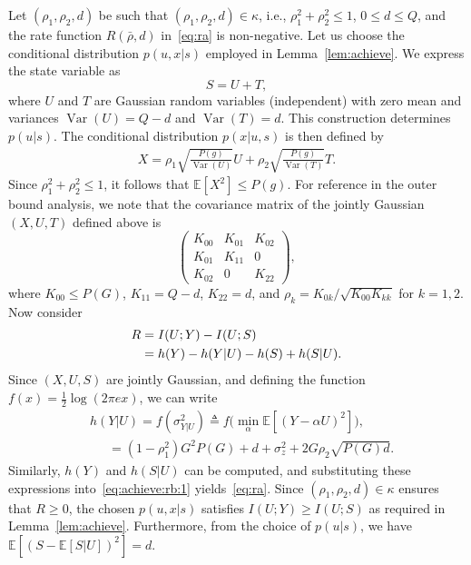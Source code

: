 \documentclass[journal]{IEEEtran}
\DeclareMathOperator{\Var}{Var}
\begin{document}
Let $(\rho_1, \rho_2, d)$ be such that $(\rho_1, \rho_2, d) \in \kappa$, i.e., $\rho_1^2 + \rho_2^2 \leq 1$, $0 \leq d \leq Q$, and the rate function $R(\bar{\rho}, d)$ in~\eqref{eq:ra} is non-negative. Let us choose the conditional distribution $p(u,x|s)$ employed in Lemma~\ref{lem:achieve}.
We express the state variable as
\begin{equation}
S = U + T, \label{eqs}
\end{equation}
where $U$ and $T$ are Gaussian random variables (independent) with zero mean and variances $\Var(U) = Q - d$ and $\Var(T) = d$. This construction determines $p(u|s)$. The conditional distribution $p(x|u,s)$ is then defined by
\begin{align} \label{eq:inp:1}
X = \rho_1 \sqrt{\frac{P(g)}{\Var(U)}} U
+ \rho_2 \sqrt{\frac{P(g)}{\Var(T)}} T.
\end{align}
Since $\rho_1^2 + \rho_2^2 \leq 1$, it follows that $\mathbb{E}[X^2] \leq P(g)$. For reference in the outer bound analysis, we note that the covariance matrix of the jointly Gaussian $(X, U, T)$ defined above is
\begin{equation}
\left(
\begin{array}{ccc}
K_{00} & K_{01} & K_{02}\\
K_{01} & K_{11} & 0\\
K_{02} & 0 & K_{22}
\end{array}
\right),
\end{equation}
where $K_{00} \leq P(G)$, $K_{11} = Q - d$, $K_{22} = d$, and $\rho_k = K_{0k}/\sqrt{K_{00}K_{kk}}$ for $k = 1, 2$. Now consider
\begin{align}
    R &= I(U;Y) - I(U;S) \notag\\
      &= h(Y) - h(Y|U) - h(S) + h(S|U). \label{eq:achieve:rb:1}
\end{align}
Since $(X,U,S)$ are jointly Gaussian, and defining the function $f(x) = \tfrac{1}{2}\log(2\pi e x)$, we can write
\begin{align}  \label{eq:hat:ps:2}
    &h(Y|U) = f(\sigma_{Y|U}^2) \triangleq f\bigl(\min_{\alpha} \mathbb{E}\!\left[(Y - \alpha U)^2\right]\bigr), \\
    &\phantom{ww}= (1 - \rho_1^2)G^2 P(G)
       + d + \sigma_z^2
       + 2G\rho_2\sqrt{P(G)d}.
\end{align}
Similarly, $h(Y)$ and $h(S|U)$ can be computed, and substituting these expressions into~\eqref{eq:achieve:rb:1} yields~\eqref{eq:ra}. 
Since $(\rho_1, \rho_2, d) \in \kappa$ ensures that $R \geq 0$, the chosen $p(u,x|s)$ satisfies $I(U;Y) \geq I(U;S)$ as required in Lemma~\ref{lem:achieve}. 
Furthermore, from the choice of $p(u|s)$, we have $\mathbb{E}\!\left[\left(S - \mathbb{E}[S|U]\right)^2\right] = d.$ %
\end{document}
